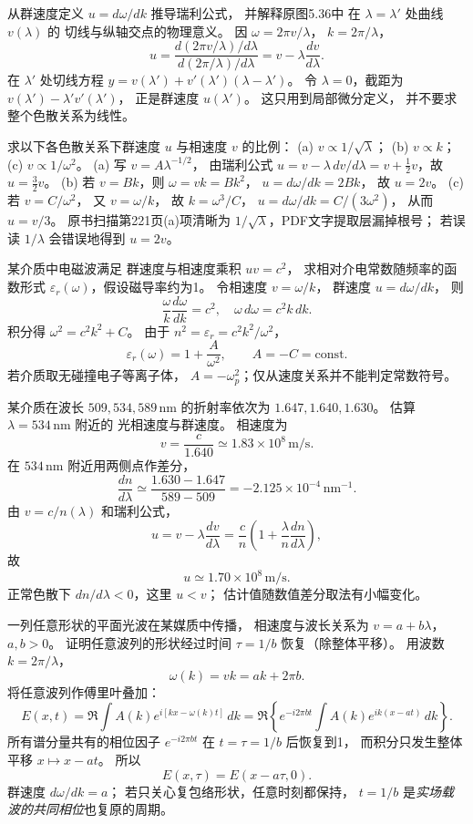 从群速度定义 $u=d\omega/dk$ 推导瑞利公式，
并解释原图5.36中
在 $\lambda=\lambda'$ 处曲线 $v(\lambda)$ 的
切线与纵轴交点的物理意义。
\exsolution
因 $\omega=2\pi v/\lambda$，
$k=2\pi/\lambda$，
\[
 u=\frac{d(2\pi v/\lambda)/d\lambda}
 {d(2\pi/\lambda)/d\lambda}
 =\boxed{v-\lambda\frac{dv}{d\lambda}}.
\]
在 $\lambda'$ 处切线方程
$y=v(\lambda')+v'(\lambda')(\lambda-\lambda')$。
令 $\lambda=0$，截距为
$v(\lambda')-\lambda'v'(\lambda')$，
正是群速度 $u(\lambda')$。
\excheck 这只用到局部微分定义，
并不要求整个色散关系为线性。

求以下各色散关系下群速度 $u$ 与相速度 $v$ 的比例：
(a) $v\propto1/\sqrt\lambda$；
(b) $v\propto k$；
(c) $v\propto1/\omega^2$。
\exsolution
(a) 写 $v=A\lambda^{-1/2}$，
由瑞利公式
$u=v-\lambda\,dv/d\lambda
=v+\tfrac12v$，故
$\boxed{u=\tfrac32v}$。
(b) 若 $v=Bk$，则 $\omega=vk=Bk^2$，
$u=d\omega/dk=2Bk$，
故 $\boxed{u=2v}$。
(c) 若 $v=C/\omega^2$，
又 $v=\omega/k$，
故 $k=\omega^3/C$，
$u=d\omega/dk=C/(3\omega^2)$，
从而 $\boxed{u=v/3}$。
\excheck 原书扫描第221页(a)项清晰为
$1/\sqrt{\lambda}$，PDF文字提取层漏掉根号；
若误读 $1/\lambda$ 会错误地得到 $u=2v$。

某介质中电磁波满足
群速度与相速度乘积 $uv=c^2$，
求相对介电常数随频率的函数形式
$\varepsilon_r(\omega)$，假设磁导率约为1。
\exsolution
令相速度 $v=\omega/k$，
群速度 $u=d\omega/dk$，
则
\[
 \frac\omega k\frac{d\omega}{dk}=c^2,
 \quad \omega\,d\omega=c^2 k\,dk.
\]
积分得
$\omega^2=c^2k^2+C$。
由于
$n^2=\varepsilon_r=c^2k^2/\omega^2$，
\[
 \boxed{\varepsilon_r(\omega)=1+\frac{A}{\omega^2}},
 \qquad A=-C=\mathrm{const}.
\]
\excheck 若介质取无碰撞电子等离子体，
$A=-\omega_p^2$；仅从速度关系并不能判定常数符号。

某介质在波长
$509,534,589\,\mathrm{nm}$ 的折射率依次为
$1.647,1.640,1.630$。
估算 $\lambda=534\,\mathrm{nm}$ 附近的
光相速度与群速度。
\exsolution
相速度为
\[
 \boxed{v=\frac c{1.640}\simeq1.83\times10^8\,\mathrm{m/s}}.
\]
在 $534\,\mathrm{nm}$ 附近用两侧点作差分，
\[
 \frac{dn}{d\lambda}\simeq
 \frac{1.630-1.647}{589-509}
 =-2.125\times10^{-4}\,\mathrm{nm^{-1}}.
\]
由 $v=c/n(\lambda)$ 和瑞利公式，
\[
 u=v-\lambda\frac{dv}{d\lambda}
 =\frac c n\left(1+\frac{\lambda}{n}\frac{dn}{d\lambda}\right),
\]
故
\[
 \boxed{u\simeq1.70\times10^8\,\mathrm{m/s}}.
\]
\excheck 正常色散下 $dn/d\lambda<0$，这里 $u<v$；
估计值随数值差分取法有小幅变化。

一列任意形状的平面光波在某媒质中传播，
相速度与波长关系为
$v=a+b\lambda$，$a,b>0$。
证明任意波列的形状经过时间
$\tau=1/b$ 恢复（除整体平移）。
\exsolution
用波数 $k=2\pi/\lambda$，
\[
 \omega(k)=vk=ak+2\pi b.
\]
将任意波列作傅里叶叠加：
\[
 E(x,t)=\Re\!\int A(k)
 e^{i[kx-\omega(k)t]}\,dk
 =\Re\!\left\{
 e^{-i2\pi bt}
 \int A(k)e^{ik(x-at)}\,dk\right\}.
\]
所有谱分量共有的相位因子
$e^{-i2\pi bt}$ 在
$t=\tau=1/b$ 后恢复到1，
而积分只发生整体平移 $x\mapsto x-at$。
所以
\[
 \boxed{E(x,\tau)=E(x-a\tau,0)}.
\]
\excheck 群速度 $d\omega/dk=a$；
若只关心复包络形状，任意时刻都保持，
$t=1/b$ 是\emph{实场载波的共同相位}也复原的周期。

